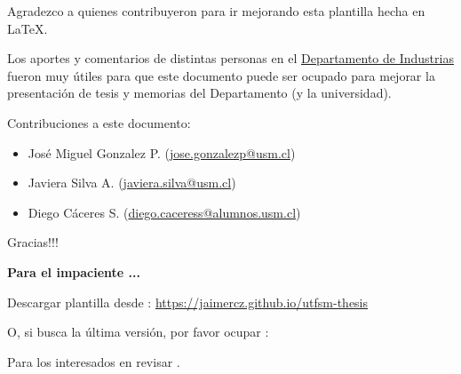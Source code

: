 
	Agradezco a quienes contribuyeron para ir mejorando esta plantilla hecha en \LaTeX{}. 
    
    Los aportes y comentarios de distintas personas en el \href{http://www.industrias.usm.cl}{Departamento de Industrias} fueron muy útiles para que este documento puede ser ocupado para mejorar la presentación de tesis y memorias del Departamento (y la universidad).
    
    Contribuciones a este documento:
    \begin{itemize}
        \item José Miguel Gonzalez P. (\href{jose.gonzalezp@usm.cl}{jose.gonzalezp@usm.cl})
        \item Javiera Silva A. (\href{javiera.silva@usm.cl}{javiera.silva@usm.cl})
        \item Diego Cáceres S. (\href{diego.caceress@alumnos.usm.cl}{diego.caceress@alumnos.usm.cl})
    \end{itemize}
    \hfill Gracias!!!


\vspace{20mm}
\begin{framed}
\noindent\textbf{\color{red}Para el impaciente ...}

Descargar plantilla desde : \url{https://jaimercz.github.io/utfsm-thesis}
	
    
\noindent O, si busca la última versión, por favor ocupar :


Para los interesados en  revisar \citet{git2017}.


\end{framed}